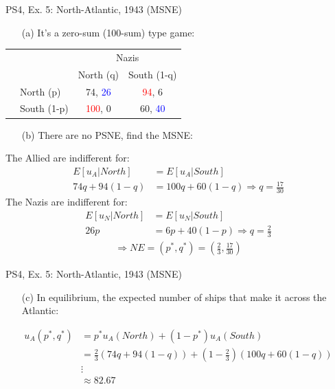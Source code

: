 \begin{frame}{PS4, Ex. 5: North-Atlantic, 1943 (MSNE)}
    \begin{itemize}
      \item[(a)] It's a zero-sum (100-sum) type game:
    \end{itemize}
    \vspace{-15pt}
    \hspace{-15pt}\begin{table}
      \begin{tabular}{cl|c|c|}
          & \multicolumn{1}{c}{} & \multicolumn{2}{c}{\color{blue}Nazis}\\
          \parbox[t]{1mm}{}
          &  &  &  \\
          & North (p)    & 74, \textcolor{blue}{26} & \textcolor{red}{94}, 6 \\
          & South (1-p)  & \textcolor{red}{100}, 0 & 60, \textcolor{blue}{40} \\
      \end{tabular}
    \end{table}
    \begin{itemize}
      \item[(b)] There are no PSNE, find the MSNE:
    \end{itemize}
    The Allied are indifferent for:
    \begin{align*}
      E[u_A|North]&=E[u_A|South]\\
      74q + 94(1-q) &= 100q + 60(1-q) \Rightarrow q = \frac{17}{30}
    \end{align*}
    The Nazis are indifferent for:
    \begin{align*}
      E[u_N|North]&=E[u_N|South]\\
      26p &= 6p + 40(1-p) \Rightarrow q = \frac{2}{3}
    \end{align*}
    \begin{align*}
      \Rightarrow NE=(p^{*},q^{*})=\left(\frac{2}{3},\frac{17}{30}\right)
    \end{align*}
\end{frame}
\begin{frame}{PS4, Ex. 5: North-Atlantic, 1943 (MSNE)}
  \begin{itemize}
    \item[(c)] In equilibrium, the expected number of ships that make it across the Atlantic:
  \end{itemize}
  \begin{align*}
     u_A(p^{*},q^{*}) &= p^{*}u_A(North)+(1-p^{*})u_A(South)\\
     &= \frac{2}{3}(74q + 94(1-q)) + \left(1-\frac{2}{3}\right)(100q + 60(1-q)) \\
     & \vdots \\
     &\approx 82.67
  \end{align*}
\end{frame}


